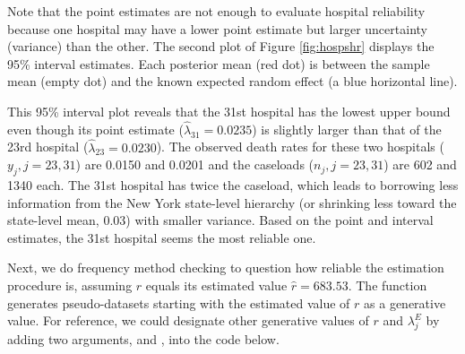 \documentclass[article]{jss}
\begin{document}
Note that the point estimates are not enough to evaluate hospital reliability because one hospital may have a lower point estimate but  larger uncertainty (variance) than the other. The second plot of Figure \ref{fig:hospshr} displays the 95\% interval estimates. Each posterior mean (red dot) is between the sample mean (empty dot) and the known expected random effect (a blue horizontal line). %

This 95\% interval plot reveals that the 31st hospital has the lowest upper bound even though its point estimate ($\hat{\lambda}_{31}=0.0235$) is slightly larger than that of the 23rd hospital ($\hat{\lambda}_{23}=0.0230$). The observed death rates for these two hospitals ($y_{j}, j=23, 31$) are 0.0150 and 0.0201 and the caseloads ($n_{j}, j =23, 31$) are 602 and 1340 each. The 31st hospital has twice the caseload, which leads to borrowing less information from the New York state-level hierarchy (or shrinking less toward the state-level mean, 0.03) with smaller variance. Based on the point and interval estimates, the 31st hospital seems the most reliable one.

Next, we do frequency method checking to question how reliable the estimation procedure is, assuming $r$ equals its estimated value $\hat{r}=683.53$.  The function   generates pseudo-datasets starting with the estimated value of $r$  as a generative value. For reference, we could designate other generative values of $r$ and $\lambda^E_j$ by adding two arguments,  and , into the code below.

\end{document}
